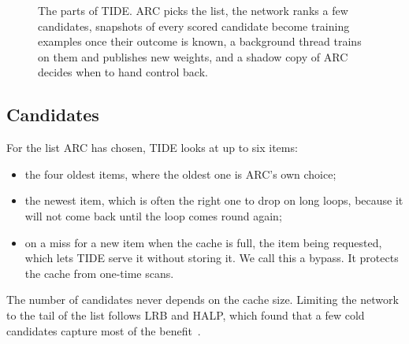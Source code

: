 \documentclass{llncs}
\begin{document}
\begin{figure}[htbp]
\centering
{}
\caption{The parts of TIDE. ARC picks the list, the network ranks a few candidates, snapshots of every scored candidate become training examples once their outcome is known, a background thread trains on them and publishes new weights, and a shadow copy of ARC decides when to hand control back.}
\label{fig:architecture}
\end{figure}

\subsection{Candidates}

For the list ARC has chosen, TIDE looks at up to six items:
\begin{itemize}
\item the four oldest items, where the oldest one is ARC's own choice;
\item the newest item, which is often the right one to drop on long loops, because it will not come back until the loop comes round again;
\item on a miss for a new item when the cache is full, the item being requested, which lets TIDE serve it without storing it. We call this a bypass. It protects the cache from one-time scans.
\end{itemize}
The number of candidates never depends on the cache size. Limiting the network to the tail of the list follows LRB and HALP, which found that a few cold candidates capture most of the benefit~\cite{song2020,song2023}.
\end{document}
